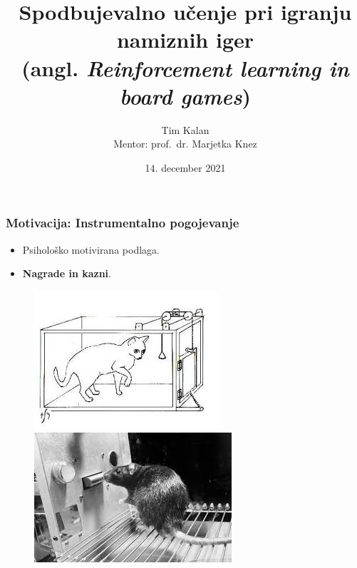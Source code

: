 \documentclass{beamer}    %
\author{Tim Kalan \\ \medskip
        \footnotesize Mentor: prof.~dr. Marjetka Knez}
\institute[FMF]{Fakulteta za matematiko in fiziko}
\title{
    Spodbujevalno učenje pri igranju namiznih iger \\ 
    \large (angl. \textit{Reinforcement learning in board games})}
\date{14. december 2021}
\begin{document}
\begin{frame}
    \titlepage
\end{frame}




\begin{frame}
    \frametitle{Motivacija: Instrumentalno pogojevanje}
    \begin{itemize}
        \item Psihološko motivirana podlaga. 
        \item \textbf{Nagrade in kazni}.
    \end{itemize}

    \begin{figure}[b]
        \includegraphics[scale=0.47]{slike/macka.jpg}
        \includegraphics[scale=0.5]{slike/miska.jpg}
    \end{figure}
            
\end{frame}
\end{document}
